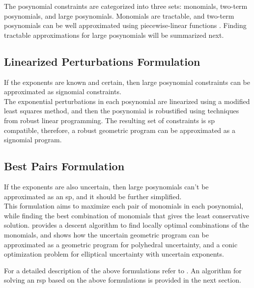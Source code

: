 The posynomial constraints are categorized into three sets: monomials, two-term posynomials, and large posynomials.
Monomials are tractable, and two-term posynomials can be well approximated using piecewise-linear functions \cite{hsiung_kim_boyd_2007}.
Finding tractable approximations for large posynomials will be summarized next.
\subsection{Linearized Perturbations Formulation}
If the exponents are known and certain, then large posynomial constraints can be approximated as signomial constraints. \\
The exponential perturbations in each posynomial are linearized using a modified least squares method, and then the
posynomial is robustified using techniques from robust linear programming. The resulting set of constraints is \gls{sp} compatible,
therefore, a robust geometric program can be approximated as a signomial program.

\subsection{Best Pairs Formulation}
If the exponents are also uncertain, then large posynomials can't be approximated as an \gls{sp}, and it should be further simplified.\\ 
This formulation aims to maximize each pair of monomials in each posynomial, while finding the best combination of monomials that gives the least conservative solution. \cite{Saab2018} provides a descent algorithm to find locally optimal combinations of the monomials, and shows how the uncertain geometric program can be approximated as a geometric program for polyhedral uncertainty, and a conic optimization problem for elliptical uncertainty with uncertain exponents.

For a detailed description of the above formulations refer to \cite{saab2018}. An algorithm for solving an \gls{rsp} based on the above formulations is provided in the next section.